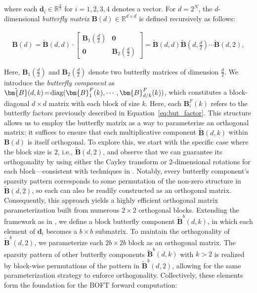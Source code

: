 where each $\bm{d}_i\in\mathbb{R}^{\frac{k}{2}}$ for $i=1,2,3,4$ denotes a vector. For $d=2^N$, the $d$-dimensional \emph{butterfly matrix} $\bm{B}(d)\in\mathbb{R}^{d\times d}$ is defined recursively as follows:

\begin{equation}
\begin{aligned}
    \!\!\bm{B}(d)=\tilde{\bm{B}}(d,d)\!\cdot\!\begin{bmatrix}
    \bm{B}_1(\frac{d}{2})\!\!\!\!\! & \bm{0} \\
    \bm{0}\!\!\!\!\! &\bm{B}_2(\frac{d}{2})
    \end{bmatrix}= \tilde{\bm{B}}(d,d)\tilde{\bm{B}}(d,\frac{d}{2})\cdots\tilde{\bm{B}}(d,2),
\end{aligned}
\end{equation}

Here, $\bm{B}_1(\frac{d}{2})$ and $\bm{B}_2(\frac{d}{2})$ denote two butterfly matrices of dimension $\frac{d}{2}$. We introduce the \emph{butterfly component} as $\thickmuskip=2mu \medmuskip=2mu \tilde{\bm{B}}(d,k)=\text{diag}(\bm{B}^F_1(k),\cdots,\bm{B}^F_{d/k}(k))$, which constitutes a block-diagonal $d\times d$ matrix with each block of size $k$. Here, each $\bm{B}^F_i(k)$ refers to the butterfly factors previously described in Equation~\ref{eq:but_factor}. This structure allows us to employ the butterfly matrix as a way to parameterize an orthogonal matrix: it suffices to ensure that each multiplicative component $\tilde{\bm{B}}(d,k)$ within $\bm{B}(d)$ is itself orthogonal. To explore this, we start with the specific case where the block size is $2$, i.e., $\tilde{\bm{B}}(d,2)$, and observe that we can guarantee its orthogonality by using either the Cayley transform or $2$-dimensional rotations for each block—consistent with techniques in \cite{liu2021orthogonal,qiu2023controlling}. Notably, every butterfly component's sparsity pattern corresponds to some permutation of the non-zero structure in $\tilde{\bm{B}}(d,2)$, so each can also be readily constructed as an orthogonal matrix. Consequently, this approach yields a highly efficient orthogonal matrix parameterization built from numerous $2\times 2$ orthogonal blocks. Extending the framework as in \cite{chen2022pixelated}, we define a block butterfly component $\tilde{\bm{B}}^b(d,k)$, in which each element of $\bm{d}_i$ becomes a $b\times b$ submatrix. To maintain the orthogonality of $\tilde{\bm{B}}^b(d,2)$, we parameterize each $2b\times 2b$ block as an orthogonal matrix. The sparsity pattern of other butterfly components $\tilde{\bm{B}}^b(d,k)$ with $k>2$ is realized by block-wise permutations of the pattern in $\tilde{\bm{B}}^b(d,2)$, allowing for the same parameterization strategy to enforce orthogonality. Collectively, these elements form the foundation for the BOFT forward computation:

